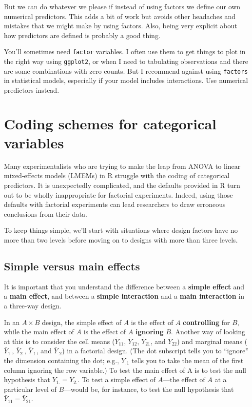 \documentclass[]{book}
\begin{document}
But we can do whatever we please if instead of using factors we define our own numerical predictors. This adds a bit of work but avoids other headaches and mistakes that we might make by using factors. Also, being very explicit about how predictors are defined is probably a good thing.

You'll sometimes need \texttt{factor} variables. I often use them to get things to plot in the right way using \texttt{ggplot2}, or when I need to tabulating observations and there are some combinations with zero counts. But I recommend against using \texttt{factors} in statistical models, especially if your model includes interactions. Use numerical predictors instead.

\hypertarget{coding-schemes-for-categorical-variables}{%
\section{Coding schemes for categorical variables}\label{coding-schemes-for-categorical-variables}}

Many experimentalists who are trying to make the leap from ANOVA to linear mixed-effects models (LMEMs) in R struggle with the coding of categorical predictors. It is unexpectedly complicated, and the defaults provided in R turn out to be wholly inappropriate for factorial experiments. Indeed, using those defaults with factorial experiments can lead researchers to draw erroneous conclusions from their data.

To keep things simple, we'll start with situations where design factors have no more than two levels before moving on to designs with more than three levels.

\hypertarget{simple-versus-main-effects}{%
\subsection{Simple versus main effects}\label{simple-versus-main-effects}}

It is important that you understand the difference between a \textbf{simple effect} and a \textbf{main effect}, and between a \textbf{simple interaction} and a \textbf{main interaction} in a three-way design.

In an \(A{\times}B\) design, the simple effect of \(A\) is the effect of \(A\) \textbf{controlling} for \(B\), while the main effect of \(A\) is the effect of \(A\) \textbf{ignoring} \(B\). Another way of looking at this is to consider the cell means (\(\bar{Y}_{11}\), \(\bar{Y}_{12}\), \(\bar{Y}_{21}\), and \(\bar{Y}_{22}\)) and marginal means (\(\bar{Y}_{1.}\), \(\bar{Y}_{2.}\), \(\bar{Y}_{.1}\), and \(\bar{Y}_{.2}\)) in a factorial design. (The dot subscript tells you to ``ignore'' the dimension containing the dot; e.g., \(\bar{Y}_{.1}\) tells you to take the mean of the first column ignoring the row variable.) To test the main effect of A is to test the null hypothesis that \(\bar{Y}_{1.}=\bar{Y}_{2.}\). To test a simple effect of \(A\)---the effect of \(A\) at a particular level of \(B\)---would be, for instance, to test the null hypothesis that \(\bar{Y}_{11}=\bar{Y}_{21}\).
\end{document}
